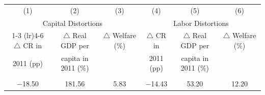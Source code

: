 \begin{tabular}{ccc ccc }
\toprule
(1) & (2) & (3) & (4) & (5) & (6) \\
\multicolumn{3}{c}{Capital Distortions} & \multicolumn{3}{c}{Labor Distortions}\\
\cmidrule(lr){1-3} \cmidrule(lr){4-6}
$\triangle$ CR in & $\triangle$ Real GDP per & $\triangle$ Welfare (\%) & $\triangle$ CR in & $\triangle$ Real GDP per & $\triangle$ Welfare (\%) \\
2011 (pp) & capita in 2011 (\%) & & 2011 (pp) & capita in 2011 (\%) & \\
& & & & & \\
$-$18.50 & 181.56 & 5.83 & $-$14.43 & 53.20 & 12.20 \\
\bottomrule
\end{tabular}
